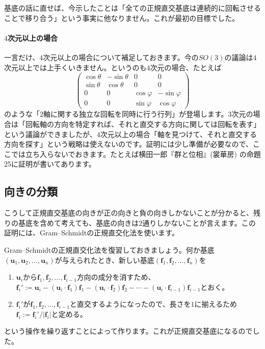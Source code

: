 基底の話に直せば、今示したことは「全ての正規直交基底は連続的に回転させることで移り合う」という事実に他なりません。これが最初の目標でした。

\paragraph{$4$次元以上の場合}

一言だけ、$4$次元以上の場合について補足しておきます。今の$SO(3)$の議論は$4$次元以上では上手くいきません。というのも$4$次元の場合、たとえば
\[
\begin{pmatrix}
\cos \theta & - \sin \theta & 0 & 0 \\
\sin \theta & \cos \theta & 0 & 0 \\
0 & 0 & \cos \varphi & -\sin \varphi \\
0 & 0 & \sin \varphi & \cos \varphi
\end{pmatrix}
\]
のような「$2$軸に関する独立な回転を同時に行う行列」が登場します。$3$次元の場合は「回転軸の方向を特定すれば、それと直交する方向に関しては回転を表す」という議論ができましたが、$4$次元以上の場合「軸を見つけて、それと直交する方向を探す」という戦略は使えないのです。証明には少し準備が必要なので、ここでは立ち入らないでおきます。たとえば横田一郎『群と位相』(裳華房) の命題25に証明が書いてあります。


\subsection{向きの分類}

こうして正規直交基底の向きが正の向きと負の向きしかないことが分かると、残りの基底を含めて考えても、基底の向きは$2$通りしかないことが言えます。この証明には、Gram--Schmidtの正規直交化法を使います。

Gram--Schmidtの正規直交化法を復習しておきましょう。何か基底$(\bm{u}_1, \bm{u}_2, \ldots, \bm{u}_n)$が与えられたとき、新しい基底$(\bm{f}_1, \bm{f}_2, \ldots, \bm{f}_n)$を
\begin{enumerate}
\item $\bm{u}_i$から$\bm{f}_1, \bm{f}_2, \ldots, \bm{f}_{i - 1}$方向の成分を消すため、$\bm{f}_i' := \bm{u}_i - (\bm{u}_i \cdot \bm{f}_1) \bm{f}_1 - (\bm{u}_i \cdot \bm{f}_2) \bm{f}_2 - \cdots - (\bm{u}_i \cdot \bm{f}_{i - 1}) \bm{f}_{i - 1}$とおく。
\item $\bm{f}_i'$が$\bm{f}_1, \bm{f}_2, \ldots, \bm{f}_{i - 1}$と直交するようになったので、長さを$1$に揃えるため$\bm{f}_i := \bm{f}_i' / |\bm{f}_i|$と定める。
\end{enumerate}
という操作を繰り返すことによって作ります。これが正規直交基底になるのでした。

